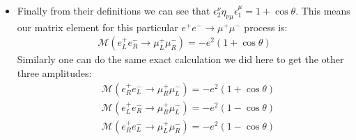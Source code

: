 \documentclass[11pt]{article}
\numberwithin{equation}{section}
\begin{document}
\begin{itemize}
     \item Finally from their definitions we can see that $\epsilon_2^{\nu}\eta_{\nu\mu}\epsilon_{1}^{\mu} = 1+\cos\theta$. This means our matrix element for this particular $e^+e^- \rightarrow \mu^+\mu^-$ process is:
     \begin{align*}
         \mathcal{M}\left(e_L^+e_R^- \rightarrow \mu_L^+\mu_R^-\right) = -e^2(1+\cos \theta)
     \end{align*}
     Similarly one can do the same exact calculation we did here to get the other three amplitudes:
     \begin{align*}
         &\mathcal{M}\left(e_R^+e_L^- \rightarrow \mu_R^+\mu_L^-\right) = -e^2(1+\cos \theta) \\
        &\mathcal{M}\left(e_L^+e_R^- \rightarrow \mu_R^+\mu_L^-\right) = -e^2(1-\cos \theta) \\
        &\mathcal{M}\left(e_R^+e_L^- \rightarrow \mu_L^+\mu_R^-\right) = -e^2(1-\cos \theta)
     \end{align*}
\end{itemize}
\end{document}
